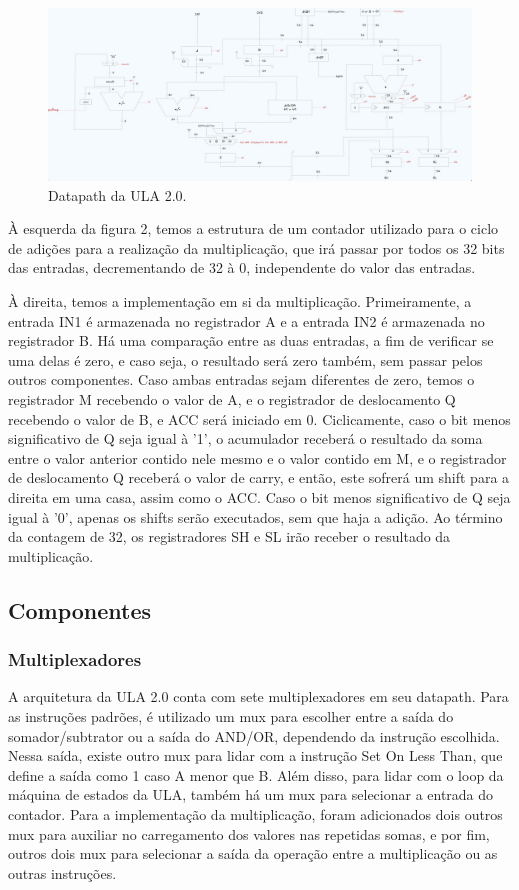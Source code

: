 \documentclass[conference]{IEEEtran}
\begin{document}
\begin{figure}[htbp]
\centerline{\includegraphics[scale=0.2]{ula_datapath.jpg}}
\caption{Datapath da ULA 2.0.}
\label{fig}
\end{figure}

À esquerda da figura 2, temos a estrutura de um contador utilizado para o ciclo de adições para a realização da multiplicação, que irá passar por todos os 32 bits das entradas, decrementando de 32 à 0, independente do valor das entradas.

À direita, temos a implementação em si da multiplicação. Primeiramente, a entrada IN1 é armazenada no registrador A e a entrada IN2 é armazenada no registrador B. Há uma comparação entre as duas entradas, a fim de verificar se uma delas é zero, e caso seja, o resultado será zero também, sem passar pelos outros componentes. Caso ambas entradas sejam diferentes de zero, temos o registrador M recebendo o valor de A, e o registrador de deslocamento Q recebendo o valor de B, e ACC será iniciado em 0. Ciclicamente, caso o bit menos significativo de Q seja igual à '1', o acumulador receberá o resultado da soma entre o valor anterior contido nele mesmo e o valor contido em M, e o registrador de deslocamento Q receberá o valor de carry, e então, este sofrerá um shift para a direita em uma casa, assim como o ACC. Caso o bit menos significativo de Q seja igual à '0', apenas os shifts serão executados, sem que haja a adição. Ao término da contagem de 32, os registradores SH e SL irão receber o resultado da multiplicação.

\subsection{Componentes}

\subsubsection{Multiplexadores}
A arquitetura da ULA 2.0 conta com sete multiplexadores em seu datapath. Para as instruções padrões, é utilizado um mux para escolher entre a saída do somador/subtrator ou a saída do AND/OR, dependendo da instrução escolhida. Nessa saída, existe outro mux para lidar com a instrução Set On Less Than, que define a saída como 1 caso A menor que B. Além disso, para lidar com o loop da máquina de estados da ULA, também há um mux para selecionar a entrada do contador. Para a implementação da multiplicação, foram adicionados dois outros mux para auxiliar no carregamento dos valores nas repetidas somas, e por fim, outros dois mux para selecionar a saída da operação entre a multiplicação ou as outras instruções.\\
\end{document}
